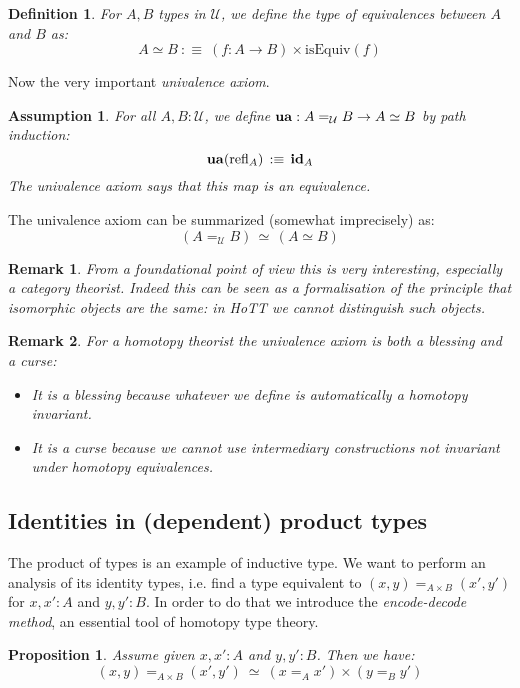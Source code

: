 \documentclass{article}
\newcommand{\sse}[1]{\medbreak \subsection{#1}}
\newcommand{\U}{{\mathcal U}}
\renewcommand{\r}{\rightarrow}
\newcommand{\Gl}{\lambda}
\newcommand{\refl}{\mathrm{refl}}
\newcommand{\id}{\mathrm{\bf id}}
\newcommand{\ua}{\mathrm{\bf ua}}
\newtheorem{definition}{Definition}
\newtheorem{proposition}{Proposition}
\newtheorem{remark}{Remark}
\newtheorem{assumption}{Assumption}
\begin{document}
\begin{definition}
For $A,B$ types in $\U$, we define the type of equivalences between $A$ and $B$ as:
\[A\simeq B \ :\equiv \ (f:A\r B)\times \mathrm{isEquiv}(f)\]
\end{definition}

Now the very important \emph{univalence axiom}.

\begin{assumption}
For all $A,B:\U$, we define $\ua : A=_\U B\r A\simeq B$ by path induction:
\[\ua(\refl_A) \, :\equiv\, \id_A\]
The univalence axiom says that this map is an equivalence.
\end{assumption}

The univalence axiom can be summarized (somewhat imprecisely) as:
\[(A=_\U B) \, \simeq \, (A\simeq B)\]



\begin{remark}
From a foundational point of view this is very interesting, especially a category theorist. Indeed this can be seen as a formalisation of the principle that isomorphic objects are the same: in HoTT we cannot distinguish such objects.
\end{remark} 

\begin{remark}
For a homotopy theorist the univalence axiom is both a blessing and a curse:
\begin{itemize}
\item It is a blessing because whatever we define is automatically a homotopy invariant. %
\item It is a curse because we cannot use intermediary constructions not invariant under homotopy equivalences.
\end{itemize}
\end{remark}


\sse{Identities in (dependent) product types}

The product of types is an example of inductive type. We want to perform an analysis of its identity types, i.e. find a type equivalent to $(x,y)=_{A\times B} (x',y')$ for $x,x':A$ and $y,y':B$. In order to do that we introduce the \emph{encode-decode method}, an essential tool of homotopy type theory. %

\begin{proposition}
Assume given $x,x':A$ and $y,y':B$. Then we have:
\[(x,y)=_{A\times B}(x',y')\ \simeq\ (x=_A x')\times (y=_By')\]
\end{proposition}
\end{document}
